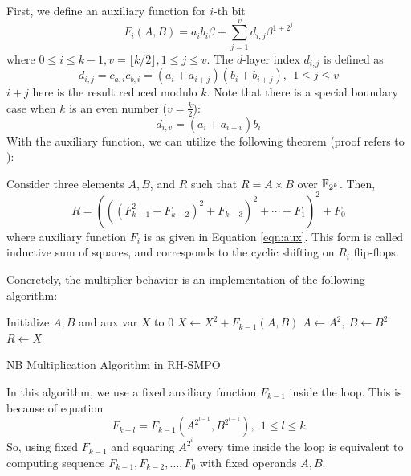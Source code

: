 \begin{Proof}
First, we define an auxiliary function for $i$-th bit 
\begin{equation}
\label{eqn:aux}
F_i(A,B) = a_ib_i\beta + \sum_{j=1}^v d_{i,j}\beta^{1+2^j}
\end{equation}
where $0\leq i\leq k-1, v = \lfloor k/2\rfloor, 1\leq j \leq v$.
The $d$-layer index $d_{i,j}$ is defined as
\begin{equation}
\label{eqn:auxDC}
d_{i,j} = c_{a,i} c_{b,i} = (a_i+a_{i+j})(b_i+b_{i+j}),~~1\leq j\leq v
\end{equation}
$i+j$ here is the result reduced modulo $k$. Note that there is a special boundary case when
$k$ is an even number ($v = \frac{k}{2}$):
$$d_{i,v} = (a_i+a_{i+v})b_i$$
With the auxiliary function, we can utilize the following theorem (proof refers to \cite{RHmulti}):
\begin{Theorem}
Consider three elements $A,B$, and $R$ such that $R=A\times B$ over ${\mathbb{F}}_{2^k}$. Then,
$$R=(((F_{k-1}^2+F_{k-2})^2+F_{k-3})^2+\cdots+F_1)^2+F_0$$
where auxiliary function $F_i$ is as given in Equation \ref{eqn:aux}.
This form is called inductive sum of squares, and corresponds to the cyclic shifting on 
$R_i$ flip-flops.
\end{Theorem}
Concretely, the multiplier behavior is an implementation of the
following algorithm:

\begin{algorithm}[H]
\SetAlgoNoLine
\LinesNumbered
  Initialize $A,B$ and aux var $X$ to 0\;
  {
	$X \gets X^2+F_{k-1}(A,B)$ 
	$A\gets A^2,~B\gets B^2$ 
  }
  $R\gets X$
\caption{NB Multiplication Algorithm in RH-SMPO \cite{RHmulti}}\label{alg:RHmulti}
\end{algorithm}

In this algorithm, we use a fixed auxiliary function $F_{k-1}$ inside the loop.
This is because of equation
$$F_{k-l} = F_{k-1}(A^{2^{l-1}},B^{2^{l-1}}),~~1\le l\le k$$
So, using fixed $F_{k-1}$ and squaring $A^{2^i}$ every time inside the loop is equivalent to computing 
sequence $F_{k-1},F_{k-2},\dots,F_0$ with fixed operands $A,B$.
\end{Proof}

